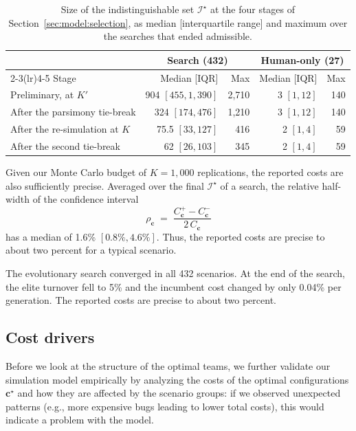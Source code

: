 \documentclass[smallextended]{svjour3}       %
\begin{document}
\begin{table}[t]
\caption{Size of the indistinguishable set $\mathcal{I}^\star$ at the four stages of Section~\ref{sec:model:selection}, as median [interquartile range] and maximum over the searches that ended admissible.}
\label{tab:results:topset}
\footnotesize
\begin{tabularx}{\linewidth}{Xrrrr}
\toprule
 & \multicolumn{2}{c}{Search (432)} & \multicolumn{2}{c}{Human-only (27)} \\
\cmidrule(lr){2-3}\cmidrule(lr){4-5}
Stage & Median [IQR] & Max & Median [IQR] & Max \\
\midrule
Preliminary, at $K'$              & 904 $[455, 1{,}390]$ & 2{,}710 & 3 $[1, 12]$ & 140 \\[2pt]
After the parsimony tie-break     & 324 $[174, 476]$ & 1{,}210 & 3 $[1, 12]$ & 140 \\[2pt]
After the re-simulation at $K$    & 75.5 $[33, 127]$ & 416      & 2 $[1, 4]$  & 59 \\[2pt]
After the second tie-break        & 62 $[26, 103]$   & 345      & 2 $[1, 4]$  & 59 \\
\bottomrule
\end{tabularx}
\end{table}

Given our Monte Carlo budget of $K=1{,}000$ replications, the reported costs are also sufficiently precise.
Averaged over the final $\mathcal{I}^\star$ of a search, the relative half-width of the confidence interval
\begin{equation}
  \rho_\mathbf{c} \;=\; \frac{C^+_\mathbf{c} - C^-_\mathbf{c}}{2\,C_\mathbf{c}}
  \label{eq:rel_halfwidth}
\end{equation}
has a median of 1.6\% $[0.8\%, 4.6\%]$. Thus, the reported costs are precise to about two percent for a typical scenario.

\begin{summarybox}
The evolutionary search converged in all 432 scenarios. At the end of the search, the elite turnover fell to 5\% and the incumbent cost changed by only 0.04\% per generation. The reported costs are precise to about two percent.
\end{summarybox}

\subsection{Cost drivers}
\label{sec:results:tradeoffs}

Before we look at the structure of the optimal teams, we further validate our simulation model empirically by analyzing the costs of the optimal configurations $\mathbf{c}^\star$ and how they are affected by the scenario groups: if we observed unexpected patterns (e.g., more expensive bugs leading to lower total costs), this would indicate a problem with the model. 
\end{document}
